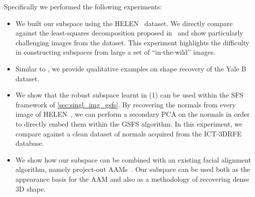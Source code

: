 Specifically we performed the following experiments:
\begin{itemize}
    \item We built our subspace using the HELEN~\cite{le2012interactive}
          dataset. We directly compare against the least-squares decomposition
          proposed in~\cite{KemelmacherShlizerman:2013iv} and show particularly
          challenging images from the dataset. This experiment highlights the
          difficulty in constructing subspaces from large a set of
          ``in-the-wild'' images.
    \item Similar to \citet{KemelmacherShlizerman:2013iv}, we provide
          qualitative examples on shape recovery of the Yale B dataset.
    \item We show that the robust subspace learnt in (1) can be used within the
          SFS framework of \cref{sec:singl_img_gsfs}. By recovering the normals
          from every image of HELEN~\cite{le2012interactive}, we can perform a
          secondary PCA on the normals in order to directly embed them within
          the GSFS algorithm. In this experiment, we compare against a clean
          dataset of normals acquired from the
          ICT-3DRFE~\cite{stratou2012exploring} database.
    \item We show how our subspace can be combined with an existing facial
    alignment algorithm, namely project-out AAMs~\cite{matthews2004active}. Our
    subspace can be used both as the appearance basis for the AAM and also as a
    methodology of recovering dense 3D shape.
\end{itemize}

